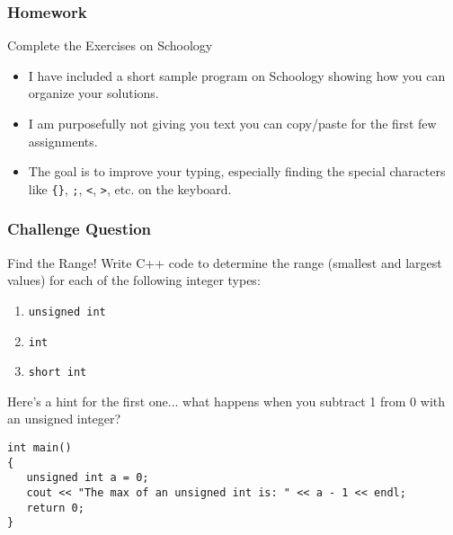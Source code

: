 \documentclass{beamer}
\begin{document}
\begin{frame}
\frametitle{Homework}
\begin{block}{Complete the Exercises on Schoology}
\begin{itemize}
    \item I have included a short sample program on Schoology showing how you can organize your solutions.
    \item I am purposefully not giving you text you can copy/paste for the first few assignments.
    \item The goal is to improve your typing, especially finding the special characters like \texttt{\{\}}, \texttt{;}, \texttt{<}, \texttt{>}, etc. on the keyboard.
\end{itemize}
\end{block}
\end{frame}

\begin{frame}[fragile]
\frametitle{Challenge Question}
\begin{exampleblock}{Find the Range!}
Write C++ code to determine the range (smallest and largest values) for each of the following integer types:
\begin{enumerate}
    \item \texttt{unsigned int}
    \item \texttt{int}
    \item \texttt{short int}
\end{enumerate}
Here's a hint for the first one... what happens when you subtract 1 from 0 with an unsigned integer?
\begin{verbatim}
int main()
{
   unsigned int a = 0;
   cout << "The max of an unsigned int is: " << a - 1 << endl;
   return 0;
}
\end{verbatim}
\end{exampleblock}
\end{frame}
\end{document}

